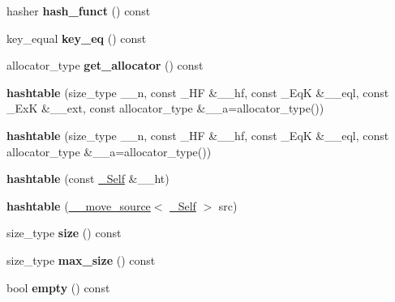 \begin{DoxyCompactItemize}
hasher {\bfseries hash\+\_\+funct} () const
\item 
\mbox{\label{classhashtable_a52477a0bb42d4170b09d90291d10ec36}} 
key\+\_\+equal {\bfseries key\+\_\+eq} () const
\item 
\mbox{\label{classhashtable_a45f92c1514cbf95304ddb11228004045}} 
allocator\+\_\+type {\bfseries get\+\_\+allocator} () const
\item 
\mbox{\label{classhashtable_ad4cab2e10219bf6e7131376288cb7adc}} 
{\bfseries hashtable} (size\+\_\+type \+\_\+\+\_\+n, const \+\_\+\+HF \&\+\_\+\+\_\+hf, const \+\_\+\+EqK \&\+\_\+\+\_\+eql, const \+\_\+\+ExK \&\+\_\+\+\_\+ext, const allocator\+\_\+type \&\+\_\+\+\_\+a=allocator\+\_\+type())
\item 
\mbox{\label{classhashtable_a23fd20375cbba8e496ee88789f89c654}} 
{\bfseries hashtable} (size\+\_\+type \+\_\+\+\_\+n, const \+\_\+\+HF \&\+\_\+\+\_\+hf, const \+\_\+\+EqK \&\+\_\+\+\_\+eql, const allocator\+\_\+type \&\+\_\+\+\_\+a=allocator\+\_\+type())
\item 
\mbox{\label{classhashtable_a68d642038380c9db090140e82daf1fef}} 
{\bfseries hashtable} (const \hyperlink{classhashtable}{\+\_\+\+Self} \&\+\_\+\+\_\+ht)
\item 
\mbox{\label{classhashtable_a1e0899e2bf53826f2531295283fdeb9d}} 
{\bfseries hashtable} (\hyperlink{class____move__source}{\+\_\+\+\_\+move\+\_\+source}$<$ \hyperlink{classhashtable}{\+\_\+\+Self} $>$ src)
\item 
\mbox{\label{classhashtable_ac2327a675ed3949ff1f36495c5211977}} 
size\+\_\+type {\bfseries size} () const
\item 
\mbox{\label{classhashtable_ab345b909b769ec74109810bc36281559}} 
size\+\_\+type {\bfseries max\+\_\+size} () const
\item 
\mbox{\label{classhashtable_a7c682967726ae9d11ddb30f476daa7dd}} 
bool {\bfseries empty} () const
\item 
\mbox{\label{classhashtable_a5bc53028dd2381c784e4bb92a318f35e}} 

\end{DoxyCompactItemize}
